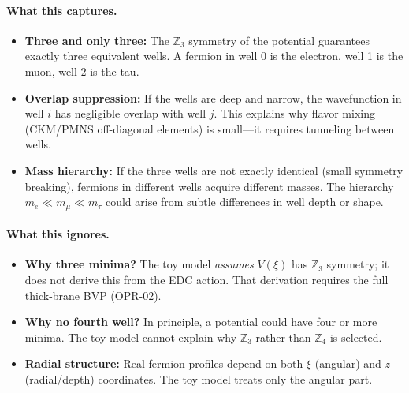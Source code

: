 \paragraph{What this captures.}
\begin{itemize}[nosep]
    \item \textbf{Three and only three:} The $\mathbb{Z}_3$ symmetry of the
          potential guarantees exactly three equivalent wells. A fermion in
          well 0 is the electron, well 1 is the muon, well 2 is the tau.
    \item \textbf{Overlap suppression:} If the wells are deep and narrow,
          the wavefunction in well $i$ has negligible overlap with well $j$.
          This explains why flavor mixing (CKM/PMNS off-diagonal elements)
          is small---it requires tunneling between wells.
    \item \textbf{Mass hierarchy:} If the three wells are not exactly
          identical (small symmetry breaking), fermions in different wells
          acquire different masses. The hierarchy $m_e \ll m_\mu \ll m_\tau$
          could arise from subtle differences in well depth or shape.
\end{itemize}

\paragraph{What this ignores.}
\begin{itemize}[nosep]
    \item \textbf{Why three minima?} The toy model \emph{assumes} $V(\xi)$
          has $\mathbb{Z}_3$ symmetry; it does not derive this from the
          EDC action. That derivation requires the full thick-brane BVP
          (OPR-02).
    \item \textbf{Why no fourth well?} In principle, a potential could have
          four or more minima. The toy model cannot explain why $\mathbb{Z}_3$
          rather than $\mathbb{Z}_4$ is selected.
    \item \textbf{Radial structure:} Real fermion profiles depend on both
          $\xi$ (angular) and $z$ (radial/depth) coordinates. The toy model
          treats only the angular part.
\end{itemize}

